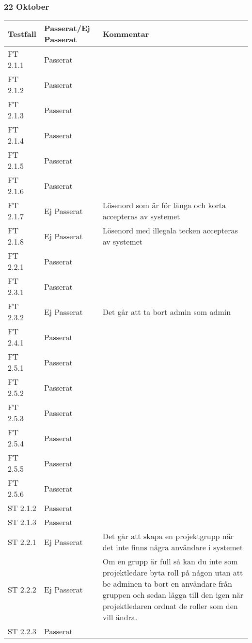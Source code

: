 \documentclass[a4paper]{article}
\begin{document}
\subsubsection{22 Oktober}
\begin{tabular}{| l | l | p{9cm} |}
\hline
Testfall &  Passerat/Ej Passerat & Kommentar\\
\hline
FT 2.1.1 & Passerat & \\
\hline
FT 2.1.2 & Passerat & \\
\hline
FT 2.1.3 & Passerat & \\
\hline
FT 2.1.4 & Passerat & \\
\hline
FT 2.1.5 & Passerat & \\
\hline
FT 2.1.6 & Passerat & \\
\hline
FT 2.1.7 & Ej Passerat & Lösenord som är för långa och korta accepteras av systemet \\
\hline
FT 2.1.8 & Ej Passerat & Lösenord med illegala tecken accepteras av systemet \\
\hline
FT 2.2.1 & Passerat & \\
\hline
FT 2.3.1 & Passerat & \\
\hline
FT 2.3.2 & Ej Passerat & Det går att ta bort admin som admin\\
\hline
FT 2.4.1 & Passerat & \\
\hline
FT 2.5.1 & Passerat & \\
\hline
FT 2.5.2 & Passerat & \\
\hline
FT 2.5.3 & Passerat & \\
\hline
FT 2.5.4 & Passerat & \\
\hline
FT 2.5.5 & Passerat & \\
\hline
FT 2.5.6 & Passerat & \\
\hline
ST 2.1.2 & Passerat & \\
\hline
ST 2.1.3 & Passerat & \\
\hline
ST 2.2.1 & Ej Passerat & Det går att skapa en projektgrupp när det inte finns några användare i systemet\\
\hline
ST 2.2.2 & Ej Passerat & Om en grupp är full så kan du inte som projektledare byta roll på någon utan att be adminen ta bort en användare från gruppen och sedan lägga till den igen när projektledaren ordnat de roller som den vill ändra.\\
\hline
ST 2.2.3 & Passerat & \\
\hline
\end{tabular}
\end{document}

